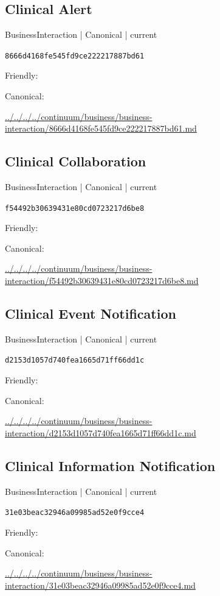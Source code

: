 \documentclass[10pt,a4paper]{article}
\begin{document}
\subsection*{Clinical Alert}
{\small BusinessInteraction | Canonical | current}\par
\texttt{8666d4168fe545fd9ce222217887bd61}\par
Friendly: \par
Canonical: \par
{\footnotesize\url{../../../../continuum/business/business-interaction/8666d4168fe545fd9ce222217887bd61.md}}\par
\subsection*{Clinical Collaboration}
{\small BusinessInteraction | Canonical | current}\par
\texttt{f54492b30639431e80cd0723217d6be8}\par
Friendly: \par
Canonical: \par
{\footnotesize\url{../../../../continuum/business/business-interaction/f54492b30639431e80cd0723217d6be8.md}}\par
\subsection*{Clinical Event Notification}
{\small BusinessInteraction | Canonical | current}\par
\texttt{d2153d1057d740fea1665d71ff66dd1c}\par
Friendly: \par
Canonical: \par
{\footnotesize\url{../../../../continuum/business/business-interaction/d2153d1057d740fea1665d71ff66dd1c.md}}\par
\subsection*{Clinical Information Notification}
{\small BusinessInteraction | Canonical | current}\par
\texttt{31e03beac32946a09985ad52e0f9cce4}\par
Friendly: \par
Canonical: \par
{\footnotesize\url{../../../../continuum/business/business-interaction/31e03beac32946a09985ad52e0f9cce4.md}}\par
\end{document}
